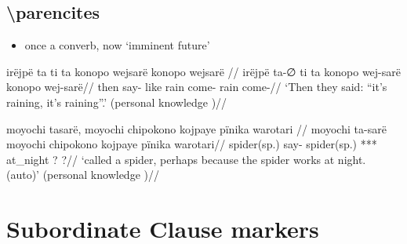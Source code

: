 \documentclass{memoir}
\begin{document}
\subsection{\texorpdfstring{ \textbackslash parencites
\label{sec:sareimn}}{ \textbackslash parencites }}

\begin{itemize}
\tightlist
\item
  once a converb, now `imminent future'
\end{itemize}

\ex \label{ctorat-25}
\begingl \glpreamble irëjpë ta ti ta konopo wejsarë konopo wejsarë //
\gla irëjpë ta-∅ ti ta konopo wej-sarë konopo wej-sarë//
\glb then say-  like rain come- rain come-//
\glft ‘Then they said: “it’s raining, it’s raining”.’ (personal knowledge
)//
\endgl
\xe

\ex \label{ctoaragrme-25}
\begingl \glpreamble moyochi tasarë, moyochi chipokono kojpaye pïnika warotari //
\gla moyochi ta-sarë moyochi chipokono kojpaye pïnika warotari//
\glb spider(sp.) say- spider(sp.) *** at\_night ? ?//
\glft ‘called a spider, perhaps because the spider works at night. (auto)’ (personal knowledge
)//
\endgl
\xe

\section{Subordinate Clause markers}
\end{document}
